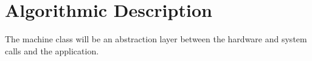 \section{Algorithmic Description}

The machine class will be an abstraction layer between the hardware and system
calls and the application.











